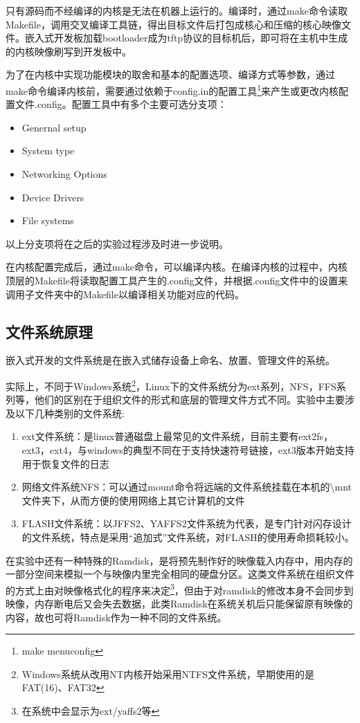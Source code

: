 \documentclass[hyperref,UTF8]{ctexart}
\begin{document}
只有源码而不经编译的内核是无法在机器上运行的。编译时，通过make命令读取Makefile，调用交叉编译工具链，得出目标文件后打包成核心和压缩的核心映像文件。嵌入式开发板加载bootloader成为tftp协议的目标机后，即可将在主机中生成的内核映像刷写到开发板中。

为了在内核中实现功能模块的取舍和基本的配置选项、编译方式等参数，通过make命令编译内核前，需要通过依赖于config.in的配置工具\footnote{make menuconfig}来产生或更改内核配置文件.config。配置工具中有多个主要可选分支项：
\begin{itemize}
    \item Genernal setup
    \item System type
    \item Networking Options
    \item Device Drivers
    \item File systems
\end{itemize}
以上分支项将在之后的实验过程涉及时进一步说明。

在内核配置完成后，通过make命令，可以编译内核。在编译内核的过程中，内核顶层的Makefile将读取配置工具产生的.config文件，并根据.config文件中的设置来调用子文件夹中的Makefile以编译相关功能对应的代码。

\subsection{文件系统原理}\label{subsec:fs-prin}
嵌入式开发的文件系统是在嵌入式储存设备上命名、放置、管理文件的系统。

实际上，不同于Windows系统\footnote{Windows系统从改用NT内核开始采用NTFS文件系统，早期使用的是FAT(16)、FAT32}，Linux下的文件系统分为ext系列，NFS，FFS系列等，他们的区别在于组织文件的形式和底层的管理文件方式不同。实验中主要涉及以下几种类别的文件系统:
\begin{enumerate}
    \item ext文件系统：是linux普通磁盘上最常见的文件系统，目前主要有ext2fs，ext3，ext4，与windows的典型不同在于支持快速符号链接，ext3版本开始支持用于恢复文件的日志\label{item:intro-ext}
    \item 网络文件系统NFS：可以通过mount命令将远端的文件系统挂载在本机的\textbackslash mnt文件夹下，从而方便的使用网络上其它计算机的文件
    \item FLASH文件系统：以JFFS2、YAFFS2文件系统为代表，是专门针对闪存设计的文件系统，特点是采用“追加式”文件系统，对FLASH的使用寿命损耗较小。\label{item:intro-flash}
\end{enumerate}

在实验中还有一种特殊的Ramdisk，是将预先制作好的映像载入内存中，用内存的一部分空间来模拟一个与映像内里完全相同的硬盘分区。这类文件系统在组织文件的方式上由对映像格式化的程序来决定\footnote{在系统中会显示为ext/yaffs2等}，但由于对ramdisk的修改本身不会同步到映像，内存断电后又会失去数据，此类Ramdisk在系统关机后只能保留原有映像的内容，故也可将Ramdisk作为一种不同的文件系统。
\end{document}
